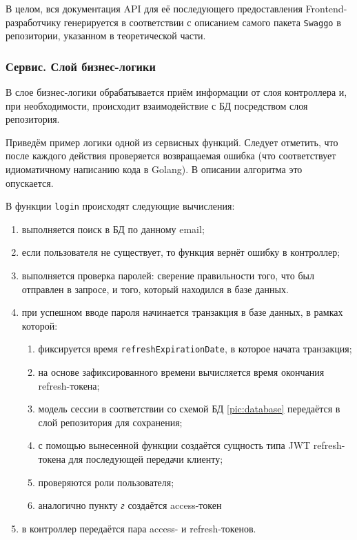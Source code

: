 \documentclass[diploma]{SCWorks}
\begin{document}
В целом, вся документация API для её последующего предоставления 
Frontend-разработчику генерируется в соответствии с описанием самого пакета
\texttt{Swaggo} в репозитории, указанном в теоретической части.

\subsubsection{Сервис. Слой бизнес-логики}

В слое бизнес-логики обрабатывается приём информации от слоя контроллера и, при
необходимости, происходит взаимодействие с БД посредством слоя репозитория.

Приведём пример логики одной из сервисных функций. Следует отметить, что после 
каждого действия проверяется возвращаемая ошибка (что соответствует 
идиоматичному написанию кода в Golang). В описании алгоритма это опускается. 

В функции \texttt{login} происходят следующие вычисления:
\begin{enumerate}
    \item выполняется поиск в БД по данному email;
    \item если пользователя не существует, то функция вернёт ошибку в контроллер;
    \item выполняется проверка паролей: сверение правильности того, что был 
    отправлен в запросе, и того, который находился в базе данных.
    \item при успешном вводе пароля начинается транзакция в базе данных, в 
    рамках которой:
    \begin{enumerate}
        \item фиксируется время \texttt{refreshExpirationDate}, в которое 
        начата транзакция;
        \item на основе зафиксированного времени вычисляется время окончания 
        refresh-токена;
        \item модель сессии в соответствии со схемой БД \ref{pic:database} 
        передаётся в слой репозитория для сохранения; 
        \item с помощью вынесенной функции создаётся сущность типа JWT 
        refresh-токена для последующей передачи клиенту;
        \item проверяются роли пользователя;
        \item аналогично пункту \textit{г} создаётся access-токен
    \end{enumerate}
    \item в контроллер передаётся пара access- и refresh-токенов.
\end{enumerate}
\end{document}
